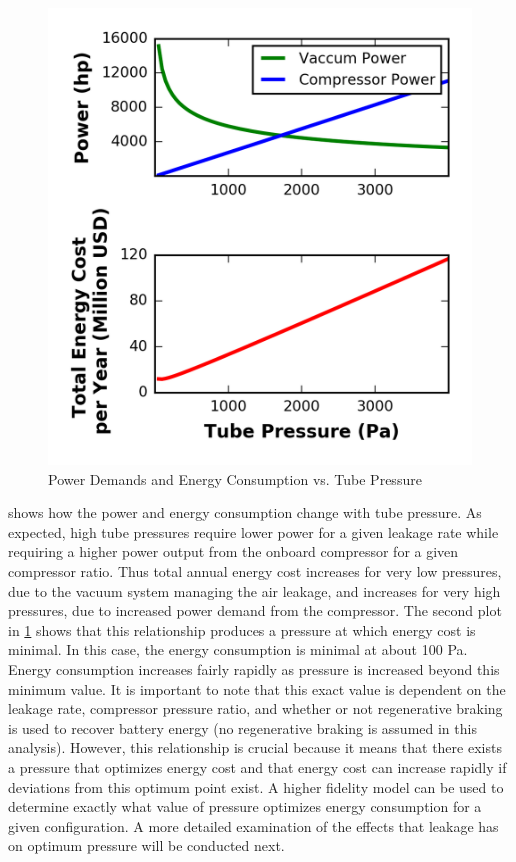 \begin{figure}
	\centering
	\includegraphics{../../images/graphs/pressure_trades/pressure_vs_power.png}
	\caption{Power Demands and Energy Consumption vs. Tube Pressure}
	\label{fig:pow_demands_vs_tube_press}
\end{figure}
 shows how the power and energy consumption
change with tube pressure. As expected, high tube pressures require lower power
for a given leakage rate while requiring a higher power output from the onboard
compressor for a given compressor ratio. Thus total annual energy cost
increases for very low pressures, due to the vacuum system managing the air
leakage, and increases for very high pressures,
due to increased power demand from the compressor.
The second plot in \cref{fig:pow_demands_vs_tube_press} shows that this
relationship produces a pressure at which energy cost is minimal. In this case,
the energy consumption is minimal at about 100 Pa. Energy consumption increases
fairly rapidly as pressure is increased beyond this minimum value. It is
important to note that this exact value is dependent on the leakage rate,
compressor pressure ratio, and whether or not regenerative braking is used to
recover battery energy (no regenerative braking is assumed in this analysis).
However, this relationship is crucial because it means that there exists a
pressure that optimizes energy cost and that energy cost can increase rapidly
if deviations from this optimum point exist. A higher fidelity model can be
used to determine exactly what value of pressure optimizes energy consumption
for a given configuration. A more detailed examination of the effects that
leakage has on optimum pressure will be conducted next.
